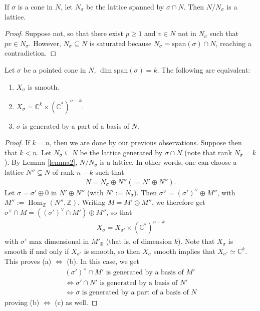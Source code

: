 \documentclass[a4paper,12pt]{amsart}
\newcommand{\ZZ}{\mathbb{Z}}
\newcommand{\RR}{\mathbb{R}}
\newcommand{\CC}{\mathbb{C}}
\DeclareMathOperator{\Hom}{Hom}
\begin{document}
\begin{Lemma}\label{lemma2}
If $\sigma$ is a cone in $N$, let $N_\sigma$ be the lattice spanned by $\sigma \cap N$. Then $N/N_\sigma$ is a lattice. 
\end{Lemma}
\begin{proof}
	Suppose not, so that there exist $p \geq 1$ and $v \in N$ not in $N_\sigma$ such that $pv \in N_\sigma$. However, $N_\sigma \subseteq N$ is saturated because $N_\sigma = \text{span}(\sigma) \cap N$, reaching a contradiction.
\end{proof}

\begin{Theorem}
	Let $\sigma$ be a pointed cone in $N$, $\dim \text{span}(\sigma) = k$. The following are equivalent:
	\begin{enumerate}
		\item $X_\sigma$ is smooth.
		\item $X_\sigma = \CC^k \times (\CC^*)^{n-k}$.
		\item $\sigma$ is generated by a part of a basis of $N$.
	\end{enumerate}
\end{Theorem}

\begin{proof}
	If $k = n$, then we are done by our previous observations. Suppose then that $k < n$. Let $N_\sigma \subseteq N$ be the lattice generated by $\sigma \cap N$ (note that rank $N_\sigma = k$). By Lemma \ref{lemma2}, $N/N_\sigma$ is a lattice. In other words, one can choose a lattice $N'' \subseteq N$ of rank $n-k$ such that 
	\begin{align*}
	N = N_\sigma \oplus N'' (= N' \oplus N'').
	\end{align*}
	Let $\sigma = \sigma' \oplus 0$ in $N' \oplus N''$ (with $N' := N_\sigma)$. Then $\sigma^\vee = (\sigma')^\vee \oplus M''$, with $M'' := \Hom_\ZZ(N'', \ZZ)$. Writing $M = M' \oplus M''$, we therefore get $\sigma^\vee \cap M = ((\sigma')^\vee \cap M') \oplus M''$, so that 
	\begin{align*}
	X_\sigma = X_{\sigma'} \times (\CC^*)^{n-k}
	\end{align*}
	with $\sigma'$ max dimensional in $M'_{\RR}$ (that is, of dimension $k$). Note that $X_\sigma$ is smooth if and only if $X_{\sigma'}$ is smooth, so then $X_{\sigma}$ smooth implies that $X_{\sigma'} \simeq \CC^k$. This proves (a) $\iff$ (b). In this case, we get
	\begin{align*}
	(\sigma')^\vee \cap M' \text{ is generated by a basis of } M' \\
	\iff \sigma' \cap N' \text{ is generated by a basis of } N' \\
	\iff \sigma \text{ is generated by a part of a basis of } N
	\end{align*}
	proving (b) $\iff$ (c) as well.
\end{proof}
\end{document}
